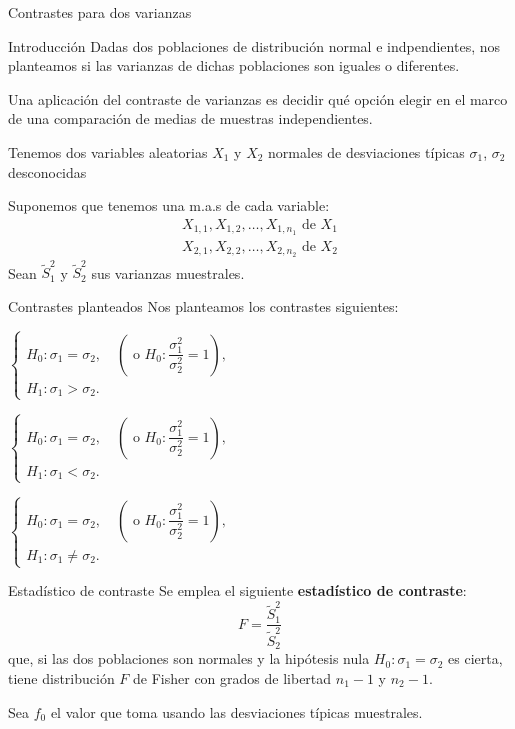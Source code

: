 \documentclass[
  ignorenonframetext,
]{beamer}
\begin{document}
\begin{frame}{Contrastes para dos varianzas}
\protect\hypertarget{contrastes-para-dos-varianzas}{}
\end{frame}

\begin{frame}{Introducción}
\protect\hypertarget{introducciuxf3n-1}{}
Dadas dos poblaciones de distribución normal e indpendientes, nos
planteamos si las varianzas de dichas poblaciones son iguales o
diferentes.

Una aplicación del contraste de varianzas es decidir qué opción elegir
en el marco de una comparación de medias de muestras independientes.

Tenemos dos variables aleatorias \(X_1\) y \(X_2\) normales de
desviaciones típicas \(\sigma_1\), \(\sigma_2\) desconocidas

Suponemos que tenemos una m.a.s de cada variable: \[
\begin{array}{l}
X_{1,1}, X_{1,2},\ldots, X_{1,n_1}\mbox{ de }X_1\\
X_{2,1}, X_{2,2},\ldots, X_{2,n_2}\mbox{ de }X_2
\end{array}
\] Sean \(\widetilde{S}_1^2\) y \(\widetilde{S}_2^2\) sus varianzas
muestrales.
\end{frame}

\begin{frame}{Contrastes planteados}
\protect\hypertarget{contrastes-planteados}{}
Nos planteamos los contrastes siguientes:

\(\left\{\begin{array}{l} H_0:\sigma_1=\sigma_2, \quad \left(\mbox{ o } H_0:\dfrac{\sigma_1^2}{\sigma_2^2}=1\right),\\ H_1:\sigma_1 > \sigma_2. \end{array} \right.\)

\(\left\{\begin{array}{l} H_0:\sigma_1=\sigma_2, \quad \left(\mbox{ o } H_0:\dfrac{\sigma_1^2}{\sigma_2^2}=1\right),\\ H_1:\sigma_1 < \sigma_2. \end{array} \right.\)

\(\left\{\begin{array}{l} H_0:\sigma_1=\sigma_2, \quad \left(\mbox{ o } H_0:\dfrac{\sigma_1^2}{\sigma_2^2}=1\right),\\ H_1:\sigma_1 \neq \sigma_2. \end{array} \right.\)
\end{frame}

\begin{frame}{Estadístico de contraste}
\protect\hypertarget{estaduxedstico-de-contraste}{}
Se emplea el siguiente \textbf{estadístico de contraste}: \[
F=\frac{\widetilde{S}_1^2}{\widetilde{S}_2^2}
\] que, si las dos poblaciones son normales y la hipótesis nula
\(H_0:\sigma_1=\sigma_2\) es cierta, tiene distribución \(F\) de Fisher
con grados de libertad \(n_1-1\) y \(n_2-1\).

Sea \(f_0\) el valor que toma usando las desviaciones típicas
muestrales.
\end{frame}
\end{document}
